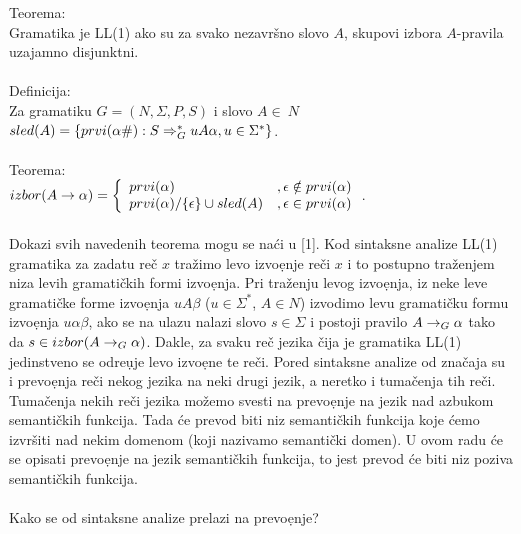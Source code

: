       Teorema:\\
      Gramatika je LL(1) ako su za svako nezavr\v sno slovo $A$, skupovi
      izbora $A$-pravila uzajamno disjunktni.\\
      \\
      Definicija:\\
      Za gramatiku $G=(N,\Sigma,P,S)$ i slovo $A\in\ N$\\
      $sled(A)=\{prvi(\alpha\#):S\Rightarrow^{*}_{G}uA\alpha,u\in\Sigma^{*}\}$.\\
      \\
      Teorema:\\
      $
        izbor(A\rightarrow\alpha)=
        \left\{
        \begin{array}{ll}
          prvi(\alpha)                         &,\epsilon\notin prvi(\alpha)\\
          prvi(\alpha)/\{\epsilon\}\cup sled(A)&,\epsilon\in prvi(\alpha)\\
        \end{array}
        \right.
      $.\\
      \\
      Dokazi svih navedenih teorema mogu se na\'ci u [1].
      Kod sintaksne analize LL(1) gramatika za zadatu re\v c $x$
      tra\v zimo levo izvo\d enje re\v ci $x$ i to postupno
      tra\v zenjem niza levih gramati\v ckih formi izvo\d enja.
      Pri tra\v zenju levog izvo\d enja, iz neke leve gramati\v cke
      forme izvo\d enja $uA\beta$ ($u\in \Sigma^{*}$, $A\in N$) izvodimo
      levu gramati\v cku formu izvo\d enja $u\alpha\beta$, ako se na ulazu
      nalazi slovo $s\in\Sigma$ i postoji pravilo $A\rightarrow_{G}\alpha$ tako da
      $s\in izbor(A\rightarrow_{G}\alpha)$.
      Dakle, za svaku re\v c jezika \v cija je gramatika LL(1) jedinstveno
      se odre\d uje levo izvo\d ene te re\v ci.
%
%
      Pored sintaksne analize od zna\v caja su i prevo\d enja re\v ci
      nekog jezika na neki drugi jezik, a neretko i tuma\v cenja tih
      re\v ci.
      Tuma\v cenja nekih re\v ci jezika mo\v zemo svesti na prevo\d enje
      na jezik nad azbukom semanti\v ckih funkcija.
      Tada \'ce prevod biti niz semanti\v ckih funkcija koje \'cemo
      izvr\v siti nad nekim domenom (koji nazivamo semanti\v cki domen).
      U ovom radu \'ce se opisati prevo\d enje na jezik semanti\v ckih
      funkcija, to jest prevod \'ce biti niz poziva semanti\v ckih
      funkcija.\\
      \\
      Kako se od sintaksne analize prelazi na prevo\d enje?\\
